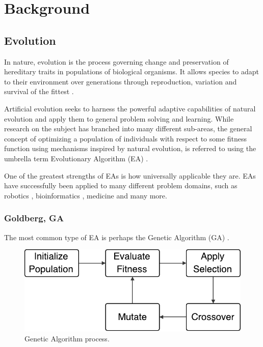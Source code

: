 
\chapter{Background}


\section{Evolution}

In nature, evolution is the process governing change and preservation of
hereditary traits in populations of biological organisms. It allows species to
adapt to their environment over generations through reproduction, variation and
survival of the fittest \cite{Darwin1859}.

Artificial evolution seeks to harness the powerful adaptive capabilities of
natural evolution and apply them to general problem solving and learning. While
research on the subject has branched into many different sub-areas, the general
concept of optimizing a population of individuals with respect to some fitness
function using mechanisms inspired by natural evolution, is referred to using
the umbrella term Evolutionary Algorithm (EA) \cite{Holland1975}.

One of the greatest strengths of EAs is how universally applicable they are. EAs
have successfully been applied to many different problem domains, such as
robotics \cite{Floreano2000}, bioinformatics \cite{KosakovskyPond2006},
medicine \cite{Fitzgerald:2015:IAS:2739480.2754761} and many more.

\subsection{Goldberg, GA}

The most common type of EA is perhaps the Genetic Algorithm (GA) \cite{Goldberg:1989:GAS:534133}.

\begin{figure}[ht]
  \centering
  \includegraphics[width=0.5\linewidth]{fig/ga}
  \caption{Genetic Algorithm process.}
  \label{fig:ga}
\end{figure}




